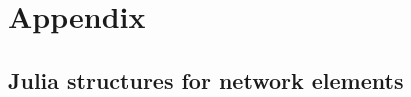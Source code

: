 \appendix				
\section{Appendix}

\subsection{Julia structures for network elements}
\label{app:jl:ne}


